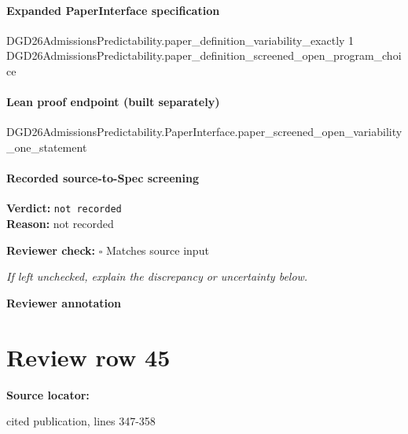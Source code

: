 \documentclass[10pt]{article}
\newcommand{\reviewerbox}{%
  \par\noindent\fbox{\parbox{0.96\linewidth}{\rule{0pt}{0.38in}}}\par
}
\newcommand{\reviewmatch}[1]{%
  \par\noindent\textbf{Reviewer check:} $\square$\; #1\par
  \noindent\emph{If left unchecked, explain the discrepancy or uncertainty below.}\par
}
\begin{document}
\paragraph{Expanded PaperInterface specification}
\begin{ReviewVerbatim}
DGD26AdmissionsPredictability.paper_definition_variability_exactly 1
  DGD26AdmissionsPredictability.paper_definition_screened_open_program_choice
\end{ReviewVerbatim}

\paragraph{Lean proof endpoint (built separately)}\begin{ReviewVerbatim}
DGD26AdmissionsPredictability.PaperInterface.paper_screened_open_variability_one_statement
\end{ReviewVerbatim}

\paragraph{Recorded source-to-Spec screening}
\textbf{Verdict:} \texttt{not recorded}
\\
\textbf{Reason:} not recorded
\reviewmatch{Matches source input}
\noindent\textbf{Reviewer annotation}\par
\reviewerbox
\clearpage
\hypertarget{source-claim-8afe5dc5804dcb73}{}
\section*{Review row 45}
\textbf{Source locator:} {\footnotesize\raggedright cited publication, lines 347-\allowbreak{}358\par}
\end{document}
